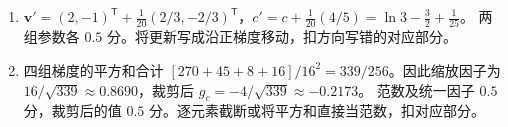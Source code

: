 \begin{enumerate}[label=(\arabic*)]
\begin{align*}
\bm{W}'&=\bm{W}+\tfrac1{20}\begin{pmatrix}6/7&-6/7&12/13\\-3/4&3/4&-6/7\end{pmatrix},\\
\bm{b}'&=\tfrac1{20}(6/7,-3/4)^{\mathsf T}.
\end{align*}
两组参数各 $0.5$ 分。把 $\epsilon$ 放进根号会得到错误更新量，扣涉及的对应部分。
\item $\bm{v}'=(2,-1)^{\mathsf T}+\tfrac1{20}(2/3,-2/3)^{\mathsf T}$，$c'=c+\tfrac1{20}(4/5)=\ln 3-\tfrac32+\tfrac1{25}$。
两组参数各 $0.5$ 分。将更新写成沿正梯度移动，扣方向写错的对应部分。
\item 四组梯度的平方和合计 $[270+45+8+16]/16^2=339/256$。因此缩放因子为 $16/\sqrt{339}\approx0.8690$，裁剪后 $g_c=-4/\sqrt{339}\approx-0.2173$。
范数及统一因子 $0.5$ 分，裁剪后的值 $0.5$ 分。逐元素截断或将平方和直接当范数，扣对应部分。
\end{enumerate}

